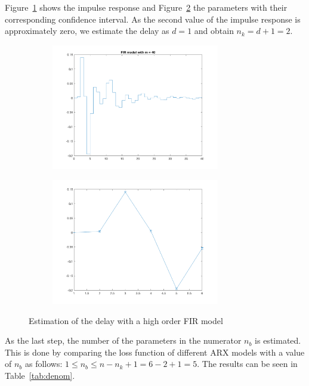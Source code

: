 \documentclass{scrartcl}
\newcommand*{\matlabcode}[3]{\begin{figure}[h!]\end{figure}}
\begin{document}
\matlabcode{../matlab/ce2/estimate_delay.m}{Matlab function for the estimation of the delay using a FIR model.}{lst:delay}

Figure~\ref{fig:fir40} shows the impulse response and Figure~\ref{fig:fir40_dev} the parameters with their corresponding confidence interval. As the second value of the impulse response is approximately zero, we estimate the delay as $d=1$ and obtain $n_k = d + 1 = 2$. 

\begin{figure}[h]
	\centering
	\begin{subfigure}{.49\textwidth}
		\includegraphics[height=5.5cm]{figures/fir40.png}
		\label{fig:fir40}
	\end{subfigure}\hfill
	\begin{subfigure}{.49\textwidth}
		\includegraphics[height=5.5cm]{figures/fir40_dev.png}
		\label{fig:fir40_dev}
	\end{subfigure}
	\caption{Estimation of the delay with a high order FIR model}
	\label{fig:delay}
\end{figure}

As the last step, the number of the parameters in the numerator $n_b$ is estimated. This is done by comparing the loss function of different ARX models with a value of $n_b$ as follows: $1 \leq n_b \leq n  - n_k + 1 = 6 - 2 + 1 = 5$. The results can be seen in Table~\ref{tab:denom}.
\end{document}
